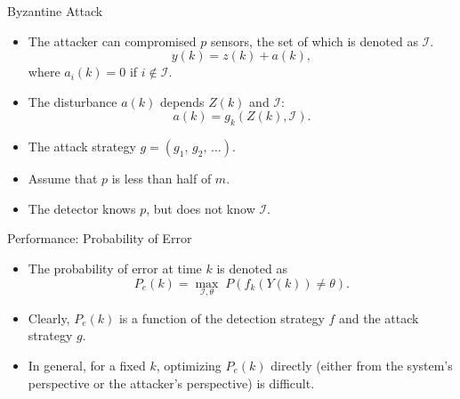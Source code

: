 \documentclass[10pt]{beamer}
\newlength\figureheight
\newlength\figurewidth
\newcommand{\tikzdir}[1]{#1.tikz}
\newcommand{\inputtikz}[1]{}}
\begin{document}
\begin{frame}{Byzantine Attack}
  \begin{itemize}
  \item The attacker can compromised $p$ sensors, the set of which is denoted as $\mathcal I$. 
    \begin{displaymath}
      y(k) = z(k) + a(k),  
    \end{displaymath}
    where $a_i(k) = 0$ if $i\notin \mathcal I$.
    \begin{center}
      \setlength{\figureheight}{2cm}
      \setlength{\figurewidth}{10cm}
      \inputtikz{blockdiagram}
    \end{center}
  \item The disturbance $a(k)$ depends $ Z(k)$ and $\mathcal I$: 
    \begin{displaymath}
      a(k) = g_k( Z(k),\mathcal I). 
    \end{displaymath}
  \item The attack strategy $g = (g_1,\,g_2,\,\dots)$.
  \item Assume that $p$ is less than half of $m$.
  \item The detector knows $p$, but does not know $\mathcal I$.
  \end{itemize}
\end{frame}

\begin{frame}{Performance: Probability of Error}
  \begin{itemize}
  \item The probability of error at time $k$ is denoted as
    \begin{displaymath}
      P_e(k) = \max_{\mathcal I,\theta}\; P(f_k(Y(k)) \neq \theta). 
    \end{displaymath}
  \item Clearly, $P_e(k)$ is a function of the detection strategy $f$ and the attack strategy $g$.
  \item  In general, for a fixed $k$, optimizing $P_e(k)$ directly (either from the system's perspective or the attacker's perspective) is difficult.
  \end{itemize}
\end{frame}
\end{document}
